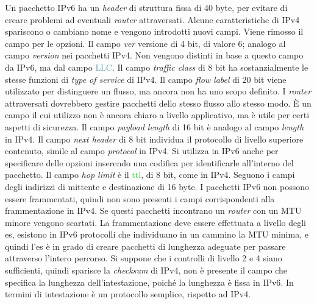 \documentclass{article}
\numberwithin{equation}{subsection}
\begin{document}
Un pacchetto \textcolor{OliveGreen}{IPv6} ha un \textit{header} di struttura fissa di 40 byte, per evitare di creare problemi ad eventuali \textit{router} attraversati. Alcune caratteristiche di \textcolor{BurntOrange}{IPv4} 
spariscono o cambiano nome e vengono introdotti nuovi campi. Viene rimosso il campo per le opzioni. 
Il campo \textit{ver} versione di 4 bit, di valore 6; analogo al campo \textit{version} nei pacchetti \textcolor{BurntOrange}{IPv4}. Non vengono distinti in base a questo campo da \textcolor{OliveGreen}{IPv6}, ma dal campo \textcolor{CadetBlue}{LLC}. Il campo \textit{traffic class} 
di 8 bit ha sostanzialmente le stesse funzioni di \textit{type of service} di \textcolor{BurntOrange}{IPv4}. Il campo \textit{flow label} di 20 bit viene utilizzato per distinguere un flusso, ma ancora non 
ha uno scopo definito. I \textit{router} attraversati dovrebbero gestire pacchetti dello stesso flusso allo stesso modo. \`{E} un campo il cui utilizzo non è ancora 
chiaro a livello applicativo, ma è utile per certi aspetti di sicurezza. Il campo \textit{payload length} di 16 bit è analogo al campo \textit{length} in \textcolor{BurntOrange}{IPv4}. Il campo 
\textit{next header} di 8 bit individua il protocollo di livello superiore contenuto, simile al campo \textit{protocol} in \textcolor{BurntOrange}{IPv4}. Si utilizza in \textcolor{OliveGreen}{IPv6} anche per specificare delle 
opzioni inserendo una codifica per identificarle all'interno del pacchetto. 
Il campo \textit{hop limit} è il \textcolor{LimeGreen}{ttl}, di 8 bit, come in \textcolor{BurntOrange}{IPv4}. Seguono i campi degli indirizzi di mittente e destinazione di 16 byte.
I pacchetti \textcolor{OliveGreen}{IPv6} non possono essere frammentati, quindi non sono presenti i campi corrispondenti alla 
frammentazione in \textcolor{BurntOrange}{IPv4}. Se questi pacchetti incontrano un \textit{router} con un \textcolor{RoyalPurple}{MTU} minore vengono scartati. La frammentazione deve essere effettuata a livello degli \textcolor{Periwinkle}{es}, esistono in 
\textcolor{OliveGreen}{IPv6} protocolli che individuano in un cammino la \textcolor{RoyalPurple}{MTU} minima, e quindi l'\textcolor{Periwinkle}{es} è in grado di creare pacchetti di lunghezza adeguate per passare attraverso l'intero percorso. 
Si suppone che i controlli di livello 2 e 4 siano sufficienti, quindi sparisce la \textit{checksum} di \textcolor{BurntOrange}{IPv4}, non è presente il campo che specifica la lunghezza dell'intestazione, poiché 
la lunghezza è fissa in \textcolor{OliveGreen}{IPv6}. In termini di intestazione è un protocollo semplice, rispetto ad \textcolor{BurntOrange}{IPv4}. 
\end{document}
